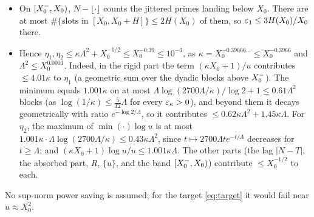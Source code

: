 \begin{itemize}
  \[
    \frac{|E_{\mathrm{rig}}(u)|}u\le\frac{\kappa X_0+1}u+\min\Bigl(1.001\kappa,\ 2700\,\Lambda e^{-\log u/\Lambda}\Bigr).
  \]
  The absorbed part is $\le h(u)\Lambda^{-8}\le u^{1/8}$ (Lemma~\ref{lem:T1}), and $\Abs=\emptyset$ for $\log\log u\le2\log\Lambda+s_H$; $R\equiv0$ below
  $x_1\ge\exp(X_0^2)$, and $|R(u)|\le2u^{\theta}\log^*u$; and $\{u\}<1$.
\item On $[X_0^{-},X_0)$, $N-\lfloor\cdot\rfloor$ counts the jittered primes landing below $X_0$. There are at most
  $\#\{\text{slots in }[X_0,X_0+H]\}\le 2H(X_0)$ of them, so $\varepsilon_1\le 3H(X_0)/X_0$ there.
\item Hence $\eta_1,\eta_2\le\kappa\Lambda^2+X_0^{-1/2}\le X_0^{-0.39}\le10^{-3}$, as $\kappa=X_0^{-0.39666\ldots}\le X_0^{-0.3966}$ and $\Lambda^2\le X_0^{0.0001}$. Indeed,
in the rigid part the term $(\kappa X_0+1)/u$ contributes
  $\le4.01\kappa$ to $\eta_1$ (a geometric sum over the dyadic blocks above $X_0^{-}$). The minimum equals $1.001\kappa$ on at most
  $\Lambda\log(2700\Lambda/\kappa)/\log2+1\le0.61\Lambda^2$ blocks (as $\log(1/\kappa)\le\tfrac5{12}\Lambda$ for every $\varepsilon_\kappa>0$), and beyond them it
  decays geometrically with ratio $e^{-\log2/\Lambda}$, so it contributes $\le0.62\kappa\Lambda^2+1.45\kappa\Lambda$. For $\eta_2$, the
  maximum of $\min(\cdot)\log u$ is at most $1.001\kappa\cdot\Lambda\log(2700\Lambda/\kappa)\le0.43\kappa\Lambda^2$, since
  $t\mapsto2700\Lambda te^{-t/\Lambda}$ decreases for $t\ge\Lambda$; and $(\kappa X_0+1)\log u/u\le1.001\kappa\Lambda$.
  The other parts (the lag $|N-T|$, the absorbed part, $R$, $\{u\}$, and the band $[X_0^{-},X_0)$) contribute $\le X_0^{-1/2}$ to each.
\end{itemize}
No sup-norm power saving is assumed; for the target \eqref{eq:target} it would fail near $u\approx X_0^2$.

